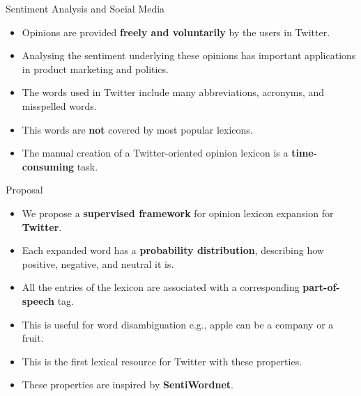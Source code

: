 \documentclass[handout]{beamer}
\begin{document}
\begin{frame}{Sentiment Analysis and Social Media}
\begin{scriptsize}
\begin{itemize}
 \item Opinions are provided \textbf{freely and voluntarily} by the users in Twitter. 
 \item Analysing the sentiment underlying these opinions has important applications in product marketing and politics.
 \item The words used in Twitter include many abbreviations, acronyms, and misspelled words.
\item This words are \textbf{not} covered by most popular lexicons.
\item The manual creation of a Twitter-oriented opinion lexicon is a \textbf{time-consuming} task.

 
 
\end{itemize}

\end{scriptsize}


\end{frame}


\begin{frame}{Proposal}
\begin{scriptsize}
\begin{itemize}
\item We propose a \textbf{supervised framework} for opinion lexicon expansion for  \textbf{Twitter}.
\item Each expanded word has a \textbf{probability distribution}, describing how positive, negative, and neutral it is.
\item All the entries of the lexicon are associated with a corresponding \textbf{part-of-speech} tag.
\item This is useful for word disambiguation e.g., apple can be a company or a fruit.
\item This is the first lexical resource for Twitter with these properties. 
\item These properties are inspired by \textbf{SentiWordnet}.
\end{itemize}
\end{scriptsize}

\end{frame}
\end{document}
